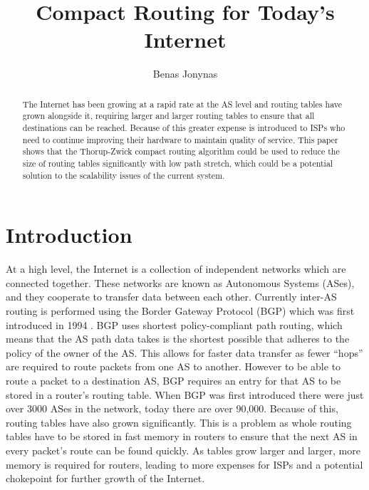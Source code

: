 \documentclass{mpaper}
\begin{document}
\title{Compact Routing for Today's Internet}
\author{Benas Jonynas}

\maketitle

\begin{abstract}
    The Internet has been growing at a rapid rate at the AS level and routing tables have grown alongside it, requiring larger and larger routing tables to ensure that all destinations can be reached. Because of this greater expense is introduced to ISPs who need to continue improving their hardware to maintain quality of service. This paper shows that the Thorup-Zwick compact routing algorithm could be used to reduce the size of routing tables significantly with low path stretch, which could be a potential solution to the scalability issues of the current system.
\end{abstract}

\section{Introduction}

At a high level, the Internet is a collection of independent networks which are connected together. These networks are known as Autonomous Systems (ASes), and they cooperate to transfer data between each other. Currently inter-AS routing is performed using the Border Gateway Protocol (BGP) which was first introduced in 1994 \cite{rfc4271}. BGP uses shortest policy-compliant path routing, which means that the AS path data takes is the shortest possible that adheres to the policy of the owner of the AS. This allows for faster data transfer as fewer ``hops'' are required to route packets from one AS to another. However to be able to route a packet to a destination AS, BGP requires an entry for that AS to be stored in a router's routing table. When BGP was first introduced there were just over 3000 \cite{RIRStats} ASes in the network, today there are over 90,000. Because of this, routing tables have also grown significantly. This is a problem as whole routing tables have to be stored in fast memory in routers to ensure that the next AS in every packet's route can be found quickly. As tables grow larger and larger, more memory is required for routers, leading to more expenses for ISPs and a potential chokepoint for further growth of the Internet. 
\end{document}
